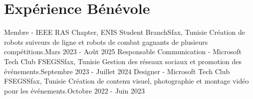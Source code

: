 \section{Expérience Bénévole}
\resumeSubHeadingListStart
  \resumeSubheading
    {Membre - IEEE RAS Chapter, ENIS Student Branch}{Sfax, Tunisie}
    {Création de robots suiveurs de ligne et robots de combat gagnants de plusieurs compétitions.}{Mars 2023 - Août 2025}
  \resumeSubheading
    {Responsable Communication - Microsoft Tech Club FSEGS}{Sfax, Tunisie}
    {Gestion des réseaux sociaux et promotion des événements.}{Septembre 2023 - Juillet 2024}
  \resumeSubheading
    {Designer - Microsoft Tech Club FSEGS}{Sfax, Tunisie}
    {Création de contenu visuel, photographie et montage vidéo pour les événements.}{Octobre 2022 - Juin 2023}
\resumeSubHeadingListEnd
